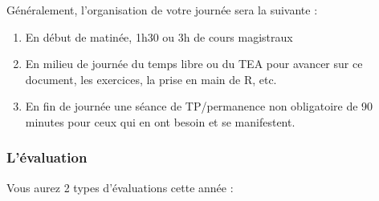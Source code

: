 \documentclass[a4paperpaper,]{article}
\providecommand{\tightlist}{%
  \setlength{\itemsep}{0pt}\setlength{\parskip}{0pt}}
\begin{document}
Généralement, l'organisation de votre journée sera la suivante :

\begin{enumerate}
\def\labelenumi{\arabic{enumi}.}
\tightlist
\item
  En début de matinée, 1h30 ou 3h de cours magistraux
\item
  En milieu de journée du temps libre ou du TEA pour avancer sur ce document, les exercices, la prise en main de R, etc.
\item
  En fin de journée une séance de TP/permanence non obligatoire de 90 minutes pour ceux qui en ont besoin et se manifestent.
\end{enumerate}

\hypertarget{levaluation}{%
\subsubsection{L'évaluation}\label{levaluation}}

Vous aurez 2 types d'évaluations cette année :
\end{document}
